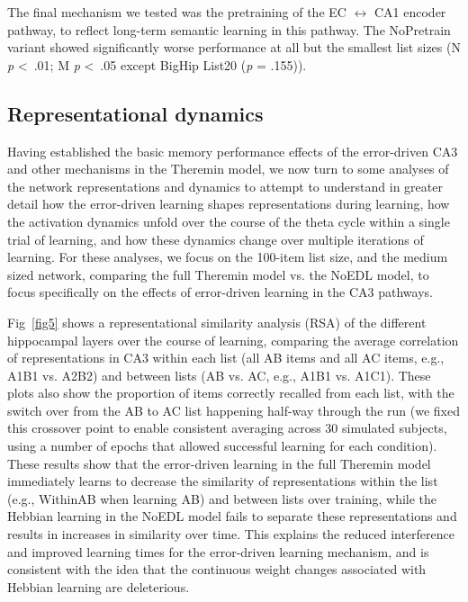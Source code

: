 \documentclass[10pt,letterpaper]{article}
\begin{document}
The final mechanism we tested was the pretraining of the EC $\leftrightarrow$ CA1 encoder pathway, to reflect long-term semantic learning in this pathway.  The NoPretrain variant showed significantly worse performance at all but the smallest list sizes (N \emph{p} \textless \ .01; M \emph{p} \textless \ .05 except BigHip List20 (\emph{p} = .155)). 

\subsection*{Representational dynamics}

Having established the basic memory performance effects of the error-driven CA3 and other mechanisms in the Theremin model, we now turn to some analyses of the network representations and dynamics to attempt to understand in greater detail how the error-driven learning shapes representations during learning, how the activation dynamics unfold over the course of the theta cycle within a single trial of learning, and how these dynamics change over multiple iterations of learning.  For these analyses, we focus on the 100-item list size, and the medium sized network, comparing the full Theremin model vs. the NoEDL model, to focus specifically on the effects of error-driven learning in the CA3 pathways.

Fig~\ref{fig5} shows a representational similarity analysis (RSA) of the different hippocampal layers over the course of learning, comparing the average correlation of representations in CA3 within each list (all AB items and all AC items, e.g., A1B1 vs. A2B2) and between lists (AB vs. AC, e.g., A1B1 vs. A1C1).  These plots also show the proportion of items correctly recalled from each list, with the switch over from the AB to AC list happening half-way through the run (we fixed this crossover point to enable consistent averaging across 30 simulated subjects, using a number of epochs that allowed successful learning for each condition).  These results show that the error-driven learning in the full Theremin model immediately learns to decrease the similarity of representations within the list (e.g., WithinAB when learning AB) and between lists over training, while the Hebbian learning in the NoEDL model fails to separate these representations and results in increases in similarity over time.  This explains the reduced interference and improved learning times for the error-driven learning mechanism, and is consistent with the idea that the continuous weight changes associated with Hebbian learning are deleterious.
\end{document}
